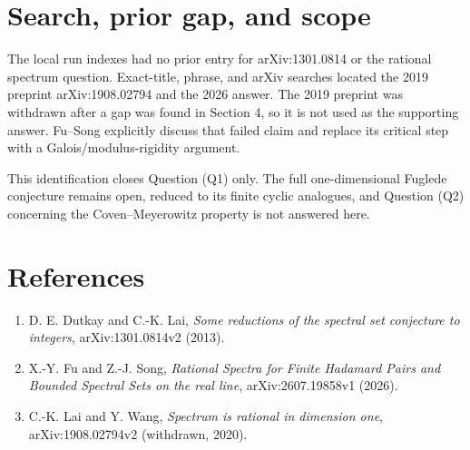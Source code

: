 \documentclass[11pt]{article}
\begin{document}
\section*{Search, prior gap, and scope}

The local run indexes had no prior entry for arXiv:1301.0814 or the rational
spectrum question. Exact-title, phrase, and arXiv searches located the 2019
preprint arXiv:1908.02794 and the 2026 answer. The 2019 preprint was withdrawn
after a gap was found in Section 4, so it is not used as the supporting answer.
Fu--Song explicitly discuss that failed claim and replace its critical step
with a Galois/modulus-rigidity argument.

This identification closes Question (Q1) only. The full one-dimensional
Fuglede conjecture remains open, reduced to its finite cyclic analogues, and
Question (Q2) concerning the Coven--Meyerowitz property is not answered here.

\section*{References}

\begin{enumerate}
\item D. E. Dutkay and C.-K. Lai, \emph{Some reductions of the spectral set
conjecture to integers}, arXiv:1301.0814v2 (2013).
\item X.-Y. Fu and Z.-J. Song, \emph{Rational Spectra for Finite Hadamard
Pairs and Bounded Spectral Sets on the real line}, arXiv:2607.19858v1 (2026).
\item C.-K. Lai and Y. Wang, \emph{Spectrum is rational in dimension one},
arXiv:1908.02794v2 (withdrawn, 2020).
\end{enumerate}
\end{document}
